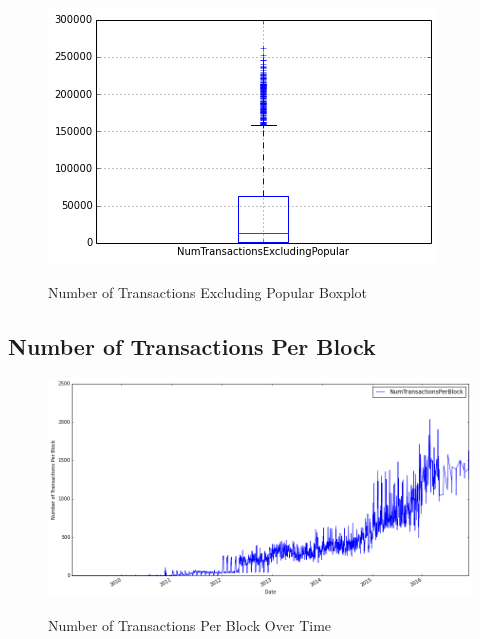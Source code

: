 \begin{figure}[bth]
  \myfloatalign
  {\includegraphics[width=1\linewidth]
    {gfx/n-transactions-excluding-popular-boxplot}}
  \caption{Number of Transactions Excluding Popular
    Boxplot}
  \label{fig:n-transactions-excluding-popular-boxplot}
\end{figure}

\clearpage

\subsection{Number of Transactions Per Block}
\label{sec:n-transactions-per-block}

\begin{figure}[bth]
  \myfloatalign
  {\includegraphics[width=1\linewidth]
    {gfx/n-transactions-per-block-over-time}}
  \caption{Number of Transactions Per Block
    Over Time}
  \label{fig:n-transactions-per-block-over-time}
\end{figure}

